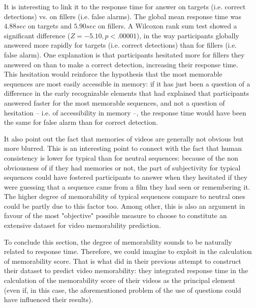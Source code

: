 \documentclass[sigconf]{acmart}
\begin{document}
It is interesting to link it to the response time for answer on targets (i.e. correct detections) vs. on fillers (i.e. false alarms).
The global mean response time was $4.88 sec$ on targets and $5.90 sec$ on fillers.
A Wilcoxon rank sum test showed a significant difference ($Z=-5.10, p<.00001$), in the way participants globally answered more rapidly for targets (i.e. correct detections) than for fillers (i.e. false alarm).
One explanation is that participants hesitated more for fillers they answered on than to make a correct detection, increasing their response time.
This hesitation would reinforce the hypothesis that the most memorable sequences are most easily accessible in memory: if it has just been a question of a difference in the early recognizable elements that had explained that participants answered faster for the most memorable sequences, and not a question of hesitation -- i.e. of accessibility in memory --, the response time would have been the same for false alarm than for correct detection.%

It also point out the fact that memories of videos are generally not obvious but more blurred.
This is an interesting point to connect with the fact that human consistency is lower for typical than for neutral sequences: because of the non obviousness of if they had memories or not, the part of subjectivity for typical sequences could have fostered participants to answer when they hesitated if they were guessing that a sequence came from a film they had seen or remembering it.
The higher degree of memorability of typical sequences compare to neutral ones could be partly due to this factor too.
Among other, this is also an argument in favour of the most "objective" possible measure to choose to constitute an extensive dataset for video memorability prediction.

To conclude this section, the degree of memorability sounds to be naturally related to response time.
Therefore, we could imagine to exploit in the calculation of memorability score.
That is what \cite{shekhar_2017_show} did in their previous attempt to construct their dataset to predict video memorability: they integrated response time in the calculation of the memorability score of their videos as the principal element (even if, in this case, the aforementioned problem of the use of questions could have influenced their results).
\end{document}
